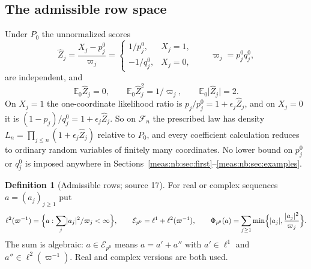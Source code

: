 \documentclass[11pt]{article}
\numberwithin{equation}{section}
\theoremstyle{definition}
\newtheorem{definition}[theorem]{Definition}
\theoremstyle{remark}
\newcommand{\E}{\mathbb E}
\newcommand{\abs}[1]{\lvert#1\rvert}
\newcommand{\Zh}{\widehat Z}
\newcommand{\Erow}{\mathcal E_{p^0}}
\begin{document}
\subsection{The admissible row space}\label{meas:nb:sub:rows}

Under $P_0$ the unnormalized scores
\begin{equation}\label{meas:nb:eq:score}
 \Zh_j=\frac{X_j-p_j^0}{\varpi_j}
 =\begin{cases}1/p_j^0,&X_j=1,\\-1/q_j^0,&X_j=0,\end{cases}
 \qquad \varpi_j=p_j^0q_j^0,
\end{equation}
are independent, and
\begin{equation}\label{meas:nb:eq:score-moments}
 \E_0\Zh_j=0,\qquad \E_0\Zh_j^2=1/\varpi_j,\qquad \E_0\abs{\Zh_j}=2.
\end{equation}
On $X_j=1$ the one-coordinate likelihood ratio is $p_j/p_j^0=1+\epsilon_j\Zh_j$, and on
$X_j=0$ it is $(1-p_j)/q_j^0=1+\epsilon_j\Zh_j$. So on $\mathcal F_n$ the prescribed law
has density $L_n=\prod_{j\le n}(1+\epsilon_j\Zh_j)$ relative to $P_0$, and every
coefficient calculation reduces to ordinary random variables of finitely many
coordinates. No lower bound on $p_j^0$ or $q_j^0$ is imposed anywhere in
Sections~\ref{meas:nb:sec:first}--\ref{meas:nb:sec:examples}.

\begin{definition}[Admissible rows; source 17]\label{meas:nb:def:rows}
For real or complex sequences $a=(a_j)_{j\ge1}$ put
\[
 \ell^2(\varpi^{-1})=\Bigl\{a:\sum_j\abs{a_j}^2/\varpi_j<\infty\Bigr\},
 \qquad
 \Erow=\ell^1+\ell^2(\varpi^{-1}),
 \qquad
 \Phi_{p^0}(a)=\sum_{j\ge1}\min\Bigl\{\abs{a_j},\frac{\abs{a_j}^2}{\varpi_j}\Bigr\}.
\]
The sum is algebraic: $a\in\Erow$ means $a=a'+a''$ with $a'\in\ell^1$ and
$a''\in\ell^2(\varpi^{-1})$. Real and complex versions are both used.
\end{definition}
\end{document}
